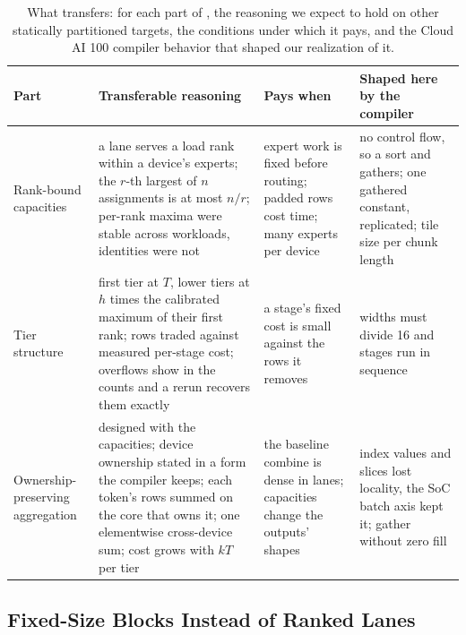 \begin{table}[t]
\caption{What transfers: for each part of \sys, the reasoning we expect to hold on other statically partitioned targets,
the conditions under which it pays, and the Cloud AI 100 compiler behavior that shaped our realization of it.}
\label{tab:transfer}
\vskip 0.1in
\begin{center}
\begin{footnotesize}
\setlength{\tabcolsep}{4pt}
\begin{tabular}{@{}>{\raggedright\arraybackslash}p{}>{\raggedright\arraybackslash}p{}>{\raggedright\arraybackslash}p{}>{\raggedright\arraybackslash}p{}@{}}
\toprule
Part & Transferable reasoning & Pays when & Shaped here by the compiler \\
\midrule
Rank-bound capacities & a lane serves a load rank within a device's experts; the $r$-th largest of $n$ assignments is at
most $n/r$; per-rank maxima were stable across workloads, identities were not & expert work is fixed before routing;
padded rows cost time; many experts per device & no control flow, so a sort and gathers; one gathered constant, replicated;
tile size per chunk length \\
Tier structure & first tier at $T$, lower tiers at $h$ times the calibrated maximum of their first rank; rows traded against
measured per-stage cost; overflows show in the counts and a rerun recovers them exactly & a stage's fixed cost is small
against the rows it removes & widths must divide 16 and stages run in sequence \\
Ownership-preserving aggregation & designed with the capacities; device ownership stated in a form the compiler keeps;
each token's rows summed on the core that owns it; one elementwise cross-device sum; cost grows with $kT$ per tier & the
baseline combine is dense in lanes; capacities change the outputs' shapes & index values and slices lost locality, the
SoC batch axis kept it; gather without zero fill \\
\bottomrule
\end{tabular}
\end{footnotesize}
\end{center}
\vskip -0.15in
\end{table}

\subsection{Fixed-Size Blocks Instead of Ranked Lanes}
\label{sec:eval-blocks}

